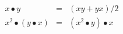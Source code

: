 \documentclass{article}
\begin{document}
\thispagestyle{empty}
\pagecolor{mycol}
\begin{eqnarray*}
x\bullet y &=& (xy+yx)/2\\
x^2\bullet\left(y\bullet x\right) &=& \left(x^2\bullet y\right)\bullet x
\end{eqnarray*}
\end{document}
